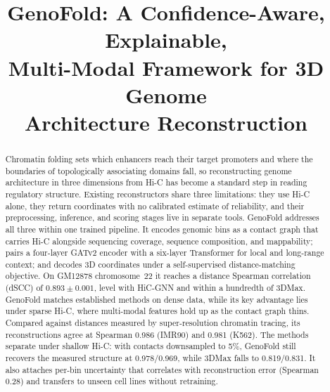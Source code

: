 \documentclass[conference]{IEEEtran}
\begin{document}
\title{GenoFold: A Confidence-Aware, Explainable,\\ Multi-Modal Framework for 3D Genome\\ Architecture Reconstruction}

\author{%
\and
{}
}

\maketitle

\begin{abstract}
Chromatin folding sets which enhancers reach their target promoters and
where the boundaries of topologically associating domains fall, so
reconstructing genome architecture in three dimensions from Hi-C has
become a standard step in reading regulatory structure. Existing
reconstructors share three limitations: they use Hi-C alone, they return
coordinates with no calibrated estimate of reliability, and their
preprocessing, inference, and scoring stages live in separate tools.
GenoFold addresses all three within one trained pipeline. It encodes
genomic bins as a contact graph that carries Hi-C alongside sequencing
coverage, sequence composition, and mappability; pairs a four-layer
GATv2 encoder with a six-layer Transformer for local and long-range
context; and decodes 3D coordinates under a self-supervised
distance-matching objective. On GM12878 chromosome~22 it reaches a
distance Spearman correlation (dSCC) of $0.893 \pm 0.001$, level with
HiC-GNN and within a hundredth of 3DMax. GenoFold matches established
methods on dense data, while its key advantage lies under sparse Hi-C,
where multi-modal features hold up as the contact graph thins. Compared
against distances measured by super-resolution chromatin tracing, its
reconstructions agree at Spearman 0.986 (IMR90) and 0.981 (K562). The
methods separate under shallow Hi-C: with contacts downsampled to 5\%,
GenoFold still recovers the measured structure at 0.978/0.969, while
3DMax falls to 0.819/0.831. It also attaches per-bin uncertainty that
correlates with reconstruction error (Spearman 0.28) and transfers to
unseen cell lines without retraining.
\end{abstract}
\end{document}
